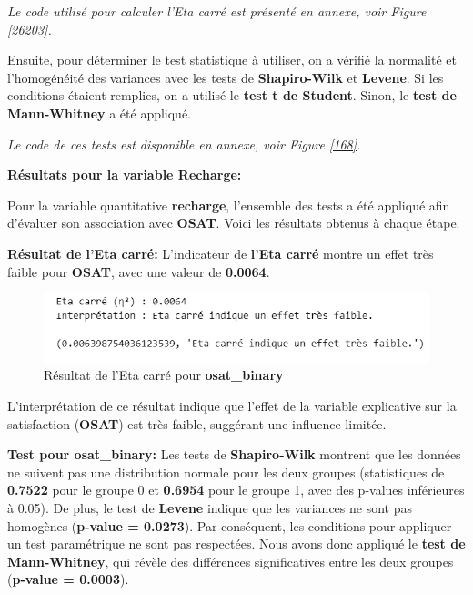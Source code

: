 \textit{Le code utilisé pour calculer l'Eta carré est présenté en annexe, voir Figure \ref{26203}.}

Ensuite, pour déterminer le test statistique à utiliser, on a vérifié la normalité et l'homogénéité des variances avec les tests de \textbf{Shapiro-Wilk} et \textbf{Levene}. Si les conditions étaient remplies, on a utilisé le \textbf{test t de Student}. Sinon, le \textbf{test de Mann-Whitney} a été appliqué.

\textit{Le code de ces tests est disponible en annexe, voir Figure \ref{168}.}

\textbf{Résultats pour la variable Recharge:}

Pour la variable quantitative \textbf{recharge}, l'ensemble des tests a été appliqué afin d'évaluer son association avec \textbf{OSAT}. Voici les résultats obtenus à chaque étape.

\textbf{\checkmark Résultat de l'Eta carré:} L'indicateur de \textbf{l'Eta carré} montre un effet très faible pour \textbf{OSAT}, avec une valeur de \textbf{0.0064}. 

\begin{figure}[H]
    \centering
    \includegraphics[width=0.8\linewidth]{capture_sas_41.png}
    \caption{Résultat de l'Eta carré pour \textbf{osat\_binary}}
\end{figure}

L'interprétation de ce résultat indique que l'effet de la variable explicative sur la satisfaction (\textbf{OSAT}) est très faible, suggérant une influence limitée.

\textbf{\checkmark Test pour \textbf{osat\_binary}:} Les tests de \textbf{Shapiro-Wilk} montrent que les données ne suivent pas une distribution normale pour les deux groupes (statistiques de \textbf{0.7522} pour le groupe 0 et \textbf{0.6954} pour le groupe 1, avec des p-values inférieures à 0.05). De plus, le test de \textbf{Levene} indique que les variances ne sont pas homogènes (\textbf{p-value = 0.0273}). Par conséquent, les conditions pour appliquer un test paramétrique ne sont pas respectées. Nous avons donc appliqué le \textbf{test de Mann-Whitney}, qui révèle des différences significatives entre les deux groupes (\textbf{p-value = 0.0003}). 

